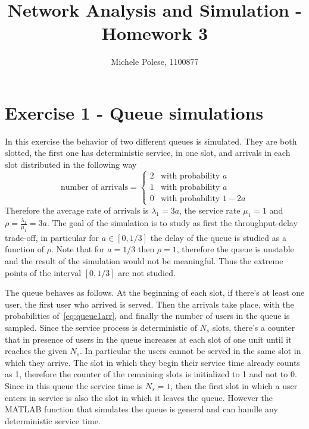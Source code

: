 \documentclass[10pt]{article}
\begin{document}
\title{Network Analysis and Simulation - Homework 3}
\author{Michele Polese, 1100877}

\maketitle

\section*{Exercise 1 - Queue simulations}
In this exercise the behavior of two different queues is simulated. They are both slotted, the first one has deterministic service, in one slot, and arrivals in each slot distributed in the following way
\begin{equation}
  \mbox{number of arrivals} = 
  \begin{cases}
    2 & \mbox{with probability } a\\
    1 & \mbox{with probability } a\\
    0 & \mbox{with probability } 1-2a
  \end{cases}
  \label{eq:queue1arr}
\end{equation}
Therefore the average rate of arrivals is $\lambda_1 = 3a$, the service rate $\mu_1 = 1$ and $\rho = \frac{\lambda_1}{\mu_1} = 3a$. 
The goal of the simulation is to study as first the throughput-delay trade-off, in particular for $a \in [0, 1/3]$ the delay of the queue is studied as a function of $\rho$. Note that for $a = 1/3$ then $\rho = 1$, therefore the queue is unstable and the result of the simulation would not be meaningful. Thus the extreme points of the interval $[0, 1/3]$ are not studied. 

The queue behaves as follows. At the beginning of each slot, if there's at least one user, the first user who arrived is served. Then the arrivals take place, with the probabilities of~\eqref{eq:queue1arr}, and finally the number of users in the queue is sampled. Since the service process is deterministic of $N_s$ slots, there's a counter that in presence of users in the queue increases at each slot of one unit until it reaches the given $N_s$. In particular the users cannot be served in the same slot in which they arrive. The slot in which they begin their service time already counts as 1, therefore the counter of the remaining slots is initialized to 1 and not to 0. Since in this queue the service time is $N_s = 1$, then the first slot in which a user enters in service is also the slot in which it leaves the queue. However the MATLAB function that simulates the queue is general and can handle any deterministic service time. 
\end{document}
